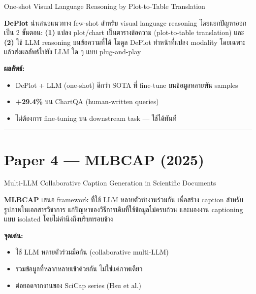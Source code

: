 \documentclass[11pt,a4paper]{article}
\begin{document}
 One-shot Visual Language Reasoning by Plot-to-Table Translation\\

\vspace{8pt}
\setlength{\parindent}{2em}
\textbf{DePlot} นำเสนอแนวทาง few-shot สำหรับ visual language reasoning
โดยแยกปัญหาออกเป็น 2 ขั้นตอน: \textbf{(1)} แปลง plot/chart เป็นตารางข้อความ
(plot-to-table translation) และ \textbf{(2)} ใช้ LLM reasoning บนข้อความที่ได้
โมดูล DePlot ทำหน้าที่แปลง modality โดยเฉพาะ
แล้วส่งผลลัพธ์ไปยัง LLM ใด ๆ แบบ plug-and-play

\vspace{6pt}
\noindent\textbf{ผลลัพธ์:}
\begin{itemize}[nosep, leftmargin=2em]
  \item DePlot + LLM (one-shot) ดีกว่า SOTA ที่ fine-tune บนข้อมูลหลายพัน samples
  \item \textbf{+29.4\%} บน ChartQA (human-written queries)
  \item ไม่ต้องการ fine-tuning บน downstream task — ใช้ได้ทันที
\end{itemize}

\vspace{12pt}
\noindent\rule{\textwidth}{0.4pt}

\section*{Paper 4 — MLBCAP (2025)}

 Multi-LLM Collaborative Caption Generation in Scientific Documents\\

\vspace{8pt}
\setlength{\parindent}{2em}
\textbf{MLBCAP} เสนอ framework ที่ใช้ LLM หลายตัวทำงานร่วมกัน
เพื่อสร้าง caption สำหรับรูปภาพในเอกสารวิชาการ
แก้ปัญหาของวิธีการเดิมที่ใช้ข้อมูลไม่ครบถ้วน
และมองงาน captioning แบบ isolated โดยไม่คำนึงถึงบริบทรอบข้าง

\vspace{6pt}
\noindent\textbf{จุดเด่น:}
\begin{itemize}[nosep, leftmargin=2em]
  \item ใช้ LLM หลายตัวร่วมมือกัน (collaborative multi-LLM)
  \item รวมข้อมูลที่หลากหลายเข้าด้วยกัน ไม่ใช่แค่ภาพเดียว
  \item ต่อยอดจากงานของ SciCap series (Hsu et al.)
\end{itemize}
\end{document}

